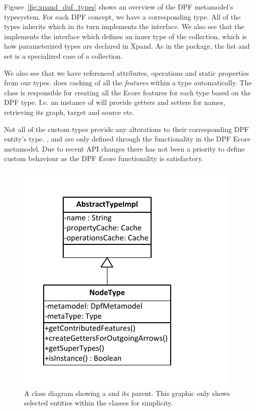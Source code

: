 Figure~\ref{fig:xpand_dpf_types} shows an overview of the DPF metamodel's typesystem. For each DPF concept, we have a corresponding type. All of the types inherits  which in its turn implements the  interface. We also see that the  implements the  interface which defines an inner type of the collection, which is how parameterized types are declared in Xpand. As in the  package, the list and set is a specialized case of a collection.

We also see that we have referenced attributes, operations and static properties from our types.  does caching of all the \emph{features} within a type automatically. The  class is responsible for creating all the Ecore features for each type based on the DPF type. I.e. an instance of  will provide getters and setters for names, retrieving its graph, target and source etc.

Not all of the custom types provide any alterations to their corresponding DPF entity's type. ,  and  are only defined through the functionality in the DPF Ecore metamodel. Due to recent API changes there has not been a priority to define custom behaviour as the DPF Ecore functionality is satisfactory.

\begin{figure}[htpb]
  \centering
  \centerline{\includegraphics[scale=0.8]{images/nodetypeuml.pdf}}
  \caption[NodeType UML]{A class diagram showing a  and its parent. This graphic only shows selected entities within the classes for simplicity.}
  \label{fig:nodetype}
\end{figure}

